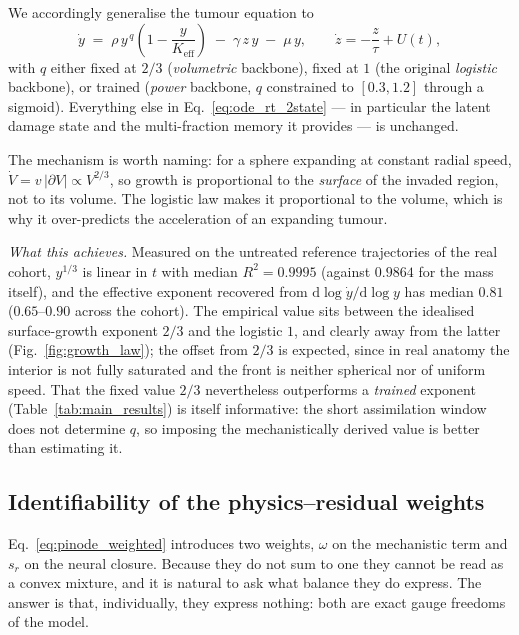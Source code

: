 We accordingly generalise the tumour equation to
\begin{equation}
\label{eq:backbone_q}
\dot y \;=\; \rho\,y^{\,q}\!\left(1-\frac{y}{K_{\mathrm{eff}}}\right)
\;-\;\gamma\,z\,y\;-\;\mu\,y ,
\qquad
\dot z = -\frac{z}{\tau} + U(t),
\end{equation}
with $q$ either fixed at $2/3$ (\emph{volumetric} backbone), fixed at $1$
(the original \emph{logistic} backbone), or trained
(\emph{power} backbone, $q$ constrained to $[0.3,1.2]$ through a sigmoid).
Everything else in Eq.~\eqref{eq:ode_rt_2state} --- in particular the latent
damage state and the multi-fraction memory it provides --- is unchanged.

The mechanism is worth naming: for a sphere expanding at constant radial speed,
$\dot V = v\,|\partial V|\propto V^{2/3}$, so growth is proportional to the
\emph{surface} of the invaded region, not to its volume. The logistic law makes
it proportional to the volume, which is why it over-predicts the acceleration of
an expanding tumour.

\emph{What this achieves.} Measured on the untreated reference trajectories of
the real cohort, $y^{1/3}$ is linear in $t$ with median $R^{2} = 0.9995$
(against $0.9864$ for the mass itself), and the effective exponent recovered
from $\mathrm{d}\log\dot y / \mathrm{d}\log y$ has median $0.81$
($0.65$--$0.90$ across the cohort). The empirical value sits
between the idealised surface-growth exponent $2/3$ and the logistic $1$, and
clearly away from the latter (Fig.~\ref{fig:growth_law}); the offset from $2/3$
is expected, since in real anatomy the interior is not fully saturated and the
front is neither spherical nor of uniform speed. That the fixed value $2/3$
nevertheless outperforms a \emph{trained} exponent
(Table~\ref{tab:main_results}) is itself informative: the short assimilation
window does not determine $q$, so imposing the mechanistically derived value is
better than estimating it.

\subsection{Identifiability of the physics--residual weights}
\label{sec:gauge}

Eq.~\eqref{eq:pinode_weighted} introduces two weights, $\omega$ on the
mechanistic term and $s_{r}$ on the neural closure. Because they do not sum to
one they cannot be read as a convex mixture, and it is natural to ask what
balance they do express. The answer is that, individually, they express nothing:
both are exact gauge freedoms of the model.

